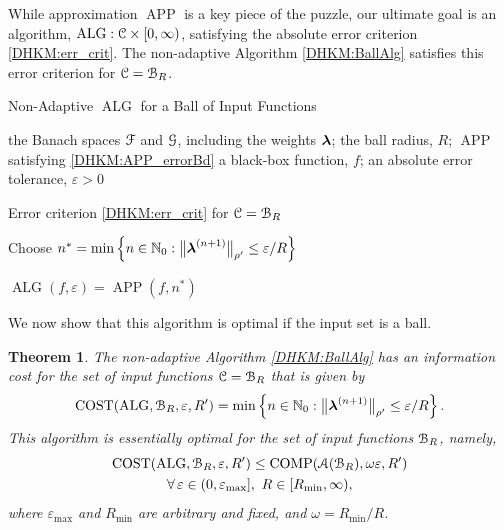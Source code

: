 \documentclass[USenglish]{article}
\theoremstyle{dgthm}
\newtheorem{theorem}{Theorem}
\theoremstyle{dgthm}
\theoremstyle{dgthm}
\theoremstyle{dgthm}
\theoremstyle{dgdef}
\theoremstyle{definition}
\DeclareMathOperator{\APP}{APP}
\DeclareMathOperator{\ALG}{ALG}
\DeclareMathOperator{\COST}{COST}
\DeclareMathOperator{\COMP}{COMP}
\newcommand{\bignorm}[2][{}]{\ensuremath{\bigl \lVert #2 \bigr \rVert}_{#1}}
\begin{document}
{While approximation $\APP$ is a key piece of the puzzle, our ultimate goal is an algorithm, $\ALG : \calC \times [0,\infty)$, satisfying the absolute error criterion \eqref{DHKM:err_crit}. The non-adaptive Algorithm \ref{DHKM:BallAlg} satisfies this error criterion for ${\mathcal{C}}  = {\mathcal{B}}_R$.  

\begin{algorithm}[H]
\caption{Non-Adaptive $\ALG$ for a Ball of Input Functions \label{DHKM:BallAlg}}
	\begin{algorithmic}
	\PARAM the Banach spaces ${\mathcal{F}}$ and ${\mathcal{G}}$, including the weights ${\boldsymbol{\lambda}}$; the ball radius, $R$; $\APP$ satisfying \eqref{DHKM:APP_errorBd}
	\INPUT a black-box function, $f$; an absolute error tolerance, $\varepsilon>0$

    \Ensure Error criterion \eqref{DHKM:err_crit} for ${\mathcal{C}} = {\mathcal{B}}_{R}$

    \State Choose $n^* =  \min \left \{n \in \N_0 : \bignorm[\rho']{\bslambda^{(n+1)}} \le \varepsilon /R \right \}$

    \RETURN $\ALG(f,\varepsilon) = \APP(f,n^*)$
\end{algorithmic}
\end{algorithm}
We now show that this algorithm is optimal if the input set is a ball.
\begin{theorem}\label{DHKM:thm_cost_non_adapt}
The non-adaptive Algorithm \ref{DHKM:BallAlg} has an information cost for the set of input functions ${\mathcal{C}} = {\mathcal{B}}_R$ that is given by
\[
\COST(\ALG, \calB_R, \varepsilon,R') = \min \left \{n \in \N_0 : \bignorm[\rho']{\bslambda^{(n+1)}} \le \varepsilon /R \right \}.
\]
This algorithm is essentially optimal for the set of input functions ${\mathcal{B}}_R$, namely,
\begin{multline*}
\COST(\ALG, \calB_R, \varepsilon,R') \le \COMP(\calA(\calB_R),\omega \varepsilon ,R') \\ \forall \, \varepsilon \in (0, \varepsilon_{\max}], \ R \in [R_{\min}, \infty),
\end{multline*}
where $\varepsilon_{\max}$ and $R_{\min}$ are arbitrary and fixed, and $\omega = R_{\min}/R$.
\end{theorem}

}
\end{document}
